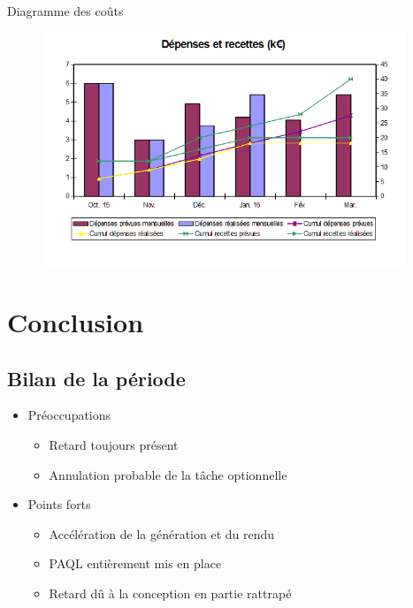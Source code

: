 \documentclass[xcolor=dvipsnames]{beamer}
\begin{document}
\begin{frame}{Diagramme des co\^uts}
	\begin{figure}
		\includegraphics[height=7cm]{Images/CourbeCout.png}
	\end{figure}
\end{frame}




\section{Conclusion}

	\subsection{Bilan de la p\'eriode}
	\begin{frame}{\subsecname}
		\begin{itemize}
			\item Pr\'eoccupations
			\begin{itemize}
				\item Retard toujours pr\'esent
				\item Annulation probable de la t\^ache optionnelle
			\end{itemize}
		\end{itemize}
		\begin{itemize}
			\item Points forts
			\begin{itemize}
				\item Acc\'el\'eration de la g\'en\'eration et du rendu
				\item PAQL enti\`erement mis en place
				\item Retard d\^u \`a la conception en partie rattrap\'e
			\end{itemize}
		\end{itemize}
	\end{frame}
\end{document}
